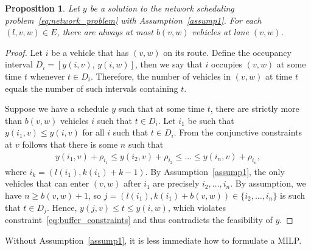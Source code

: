 \documentclass{article}
\theoremstyle{definition}
\theoremstyle{plain}
\newtheorem{proposition}{Proposition}
\begin{document}
\begin{proposition}
  Let $y$ be a solution to the network scheduling problem~\eqref{eq:network_problem} with
  Assumption~\ref{assump1}. For each $(l,v,w) \in E$, there are always at most $b(v,w)$
  vehicles at lane $(v,w)$.
\end{proposition}
\begin{proof}
  Let $i$ be a vehicle that has $(v,w)$ on its route. Define the occupancy
  interval $D_{i} = [y(i,v), \, y(i,w)]$, then we say that $i$ occupies $(v,w)$
  at some time $t$ whenever $t \in D_{i}$.
  Therefore, the number of vehicles in $(v,w)$ at time $t$ equals the number of such
  intervals containing $t$.

  Suppose we have a schedule $y$ such that at some time $t$, there are strictly
  more than $b(v,w)$ vehicles $i$ such that $t \in D_{i}$.
  Let $i_{1}$ be such that $y(i_{1},v) \leq y(i,v)$ for all $i$ such that $t \in D_{i}$.
  From the conjunctive constraints at $v$ follows that there is some $n$ such that
  \begin{align*}
    y(i_{1}, v) + \rho_{i_{1}} \leq y(i_{2}, v) + \rho_{i_{2}} \leq \dots \leq y(i_{n}, v) + \rho_{i_{n}} ,
  \end{align*}
  where $i_{k} = (l(i_{1}), k(i_{1}) + k - 1)$.
  By Assumption~\ref{assump1}, the only vehicles that can enter $(v,w)$ after
  $i_{1}$ are precisely $i_{2}, \dots, i_{n}$. By assumption, we have $n \geq b(v,w) + 1$,
  so $j = (l(i_{1}), k(i_{1}) + b(v,w)) \in \{i_{2}, \dots, i_{n}\}$ is such
  that $t \in D_{j}$.
  Hence, $y(j,v) \leq t \leq y(i,w)$,
  which violates constraint~\eqref{eq:buffer_constraints}
  and thus contradicts the feasibility of $y$.
\end{proof}


Without Assumption~\ref{assump1}, it is less immediate how to formulate a MILP.


% 
% 
\end{document}
